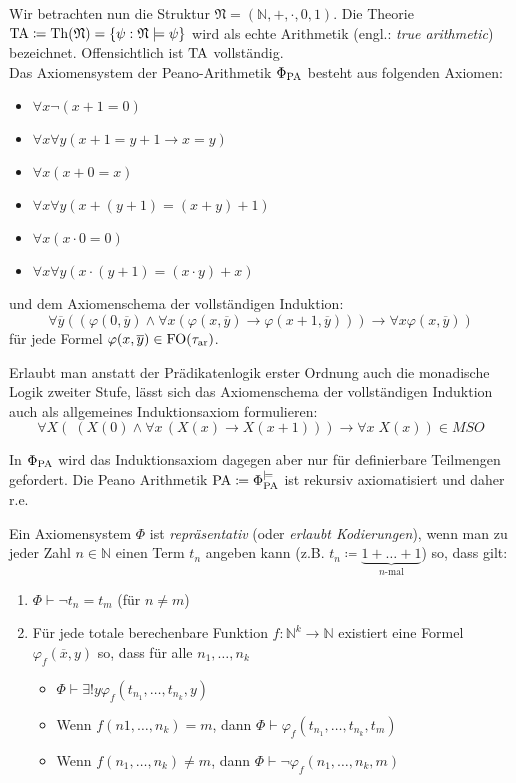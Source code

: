 Wir betrachten nun die Struktur $\mathfrak{N}=(\mathbb{N},+,\cdot,0,1)$. Die Theorie $\operatorname{TA}\coloneqq \operatorname{Th}(\mathfrak{N})=\{\psi : \mathfrak{N}\models\psi\}$ wird als echte Arithmetik (engl.: \textit{true arithmetic}) bezeichnet. Offensichtlich ist $\operatorname{TA}$ vollständig.
\\
Das Axiomensystem der Peano-Arithmetik $\Phi_{\operatorname{PA}}$ besteht aus folgenden Axiomen:
\begin{itemize}
	\item $\forall x \neg(x+1=0)$
	\item $\forall x \forall y (x+1=y+1\rightarrow x=y)$
	\item $\forall x (x+0=x)$
	\item $\forall x \forall y(x+(y+1)=(x+y)+1)$
	\item $\forall x (x\cdot 0=0)$
	\item $\forall x \forall y (x\cdot(y+1) = (x\cdot y)+x)$
\end{itemize}
und dem Axiomenschema der vollständigen Induktion: 
$$ \forall \overline{y} ( (\varphi(0,\overline{y}) \land   \forall x 
(\varphi(x,\overline{y})\rightarrow\varphi(x+1,\overline{y}))   ) 
\rightarrow \forall x \varphi(x,\overline{y})) $$
für jede Formel $\varphi(x,\overline{y})\in \operatorname{FO}(\tau_{\operatorname{ar}})$.

Erlaubt man anstatt der Prädikatenlogik erster Ordnung auch die monadische Logik zweiter Stufe, lässt sich das Axiomenschema der vollständigen Induktion auch als allgemeines Induktionsaxiom formulieren:
$$ \forall X  (\;(X(0) \land \forall x\,(X(x)\rightarrow X(x+1)) ) 
\rightarrow \forall x\; X(x))\in MSO$$

In $\Phi_{\operatorname{PA}}$ wird das Induktionsaxiom dagegen aber nur für definierbare Teilmengen gefordert. Die Peano Arithmetik $\operatorname{PA}\coloneqq \Phi_{\operatorname{PA}}^{\models}$ ist rekursiv axiomatisiert und daher r.e.

\begin{definition}
	Ein Axiomensystem $\Phi$ ist \textit{repräsentativ} (oder \textit{erlaubt Kodierungen}), wenn man zu jeder Zahl $n\in \mathbb{N}$ einen Term $t_n$ angeben kann (z.B. $t_n\coloneqq\underbrace{1+\dots+1}_{n\text{-mal}}$) so, dass gilt:
	\begin{enumerate}
		\item $\Phi\vdash \neg t_n=t_m$ (für $n\neq m$)
		\item Für jede totale berechenbare Funktion $f:\mathbb{N}^k\to\mathbb{N}$ existiert eine Formel $\varphi_f(\overline{x}, y)$ so, dass für alle $n_1,\dots,n_k$
		\begin{itemize}
			\item $\Phi\vdash \exists!y \varphi_f(t_{n_1},\dots,t_{n_k}, y)$
			\item Wenn $f(n1,\dots,n_k)=m$, dann $\Phi\vdash\varphi_f(t_{n_1},\dots,t_{n_k},t_m)$
			\item Wenn $f(n_1,\dots,n_k)\neq m$, dann $\Phi\vdash\neg\varphi_f(n_1,\dots,n_k,m)$
		\end{itemize}
	\end{enumerate}	
\end{definition}

